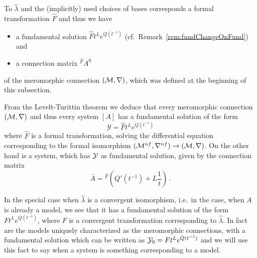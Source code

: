 To $\hat\lambda$ and the (implicitly) used choices of bases corresponds a
formal transformation $\hat F$ and thus we have
\begin{itemize}
\item a fundamental solution $\hat Ft^L e^{Q(t^{-1})}$ (cf.\
  Remark~\ref{rem:fundChangeOnFund}) and
\item a connection matrix ${}^{\hat F}\!A^0$
\end{itemize}
of the meromorphic connection $(\mathcal{M},\nabla)$, which was defined at the beginning
of this subsection.
\begin{cor}
  From the Levelt-Turittin theorem we deduce that every meromorphic connection
  $(\mathcal{M},\nabla)$ and thus every system $[A]$ has a fundamental solution of the
  form
  \[
    \mathcal{Y}=\hat F t^L e^{Q(t^{-1})}
  \]
  where $\hat F$ is a formal transformation, solving the differential equation
  corresponding to the formal isomorphism
  $(\mathcal{M}^{nf},\nabla^{nf})\to(\mathcal{M},\nabla)$.
  On the other hand is a system, which has $\mathcal{Y}$ as fundamental solution, given
  by the connection matrix
  \[
    \bar A={}^{\hat F}\!\left(Q'(t^{-1})+L\frac{1}{t}\right) \,.
  \]
  \begin{comment}
    \begin{s-rem}
      It is always possible to permutate the columns of a fundamental solution
      by
      \[
        P^{-1}\mathcal{Y}P=\hat F t^{P^{-1}LP} e^{P^{-1}Q(t^{-1})P}
      \]
      with a permutation matrix $P$ and \rewrite{obtain another fundamental
      solution for the same system} (cf.\ \cite[73]{Loday2014}).
    \end{s-rem}
  \end{comment}
\end{cor}
In the special case when $\hat\lambda$ is a convergent isomorphism, i.e.\ in
the case, when $A$ is already a model, we see that it has a fundamental
solution of the form $Ft^L e^{Q(t^{-1})}$, where $F$ is a convergent
transformation corresponding to $\hat\lambda$.
In fact are the models uniquely characterized as the meromorphic connections,
with a fundamental solution which can be written as $\mathcal{Y}_0=Ft^Le^{Q(t^{-1})}$
and we will use this fact to say when a system is something corresponding to a
model.
